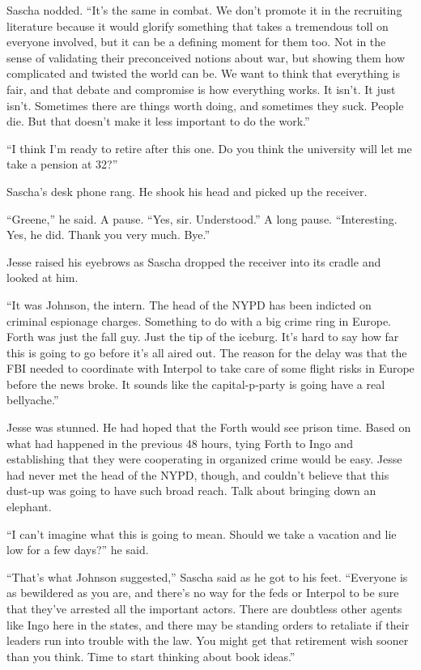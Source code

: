 \documentclass[12pt]{book}
\begin{document}
Sascha nodded.  ``It's the same in combat.  We don't promote it in the recruiting literature because it would glorify something that takes a tremendous toll on everyone involved, but it can be a defining moment for them too.  Not in the sense of validating their preconceived notions about war, but showing them how complicated and twisted the world can be.  We want to think that everything is fair, and that debate and compromise is how everything works.  It isn't.  It just isn't.  Sometimes there are things worth doing, and sometimes they suck.  People die.  But that doesn't make it less important to do the work.''

``I think I'm ready to retire after this one.  Do you think the university will let me take a pension at 32?''

Sascha's desk phone rang.  He shook his head and picked up the receiver.

``Greene,'' he said.  A pause.  ``Yes, sir.  Understood.''  A long pause.  ``Interesting.  Yes, he did.  Thank you very much.  Bye.''

Jesse raised his eyebrows as Sascha dropped the receiver into its cradle and looked at him.

``It was Johnson, the intern.  The head of the NYPD has been indicted on criminal espionage charges.  Something to do with a big crime ring in Europe.  Forth was just the fall guy.  Just the tip of the iceburg.  It's hard to say how far this is going to go before it's all aired out.  The reason for the delay was that the FBI needed to coordinate with Interpol to take care of some flight risks in Europe before the news broke.  It sounds like the capital-p-party is going have a real bellyache.''

Jesse was stunned.  He had hoped that the Forth would see prison time.  Based on what had happened in the previous 48 hours, tying Forth to Ingo and establishing that they were cooperating in organized crime would be easy.  Jesse had never met the head of the NYPD, though, and couldn't believe that this dust-up was going to have such broad reach.  Talk about bringing down an elephant.

``I can't imagine what this is going to mean.  Should we take a vacation and lie  low for a few days?'' he said.

``That's what Johnson suggested,'' Sascha said as he got to his feet.  ``Everyone is as bewildered as you are, and there's no way for the feds or Interpol to be sure that they've arrested all the important actors.  There are doubtless other agents like Ingo here in the states, and there may be standing orders to retaliate if their leaders run into trouble with the law.  You might get that retirement wish sooner than you think.  Time to start thinking about book ideas.''
\end{document}
